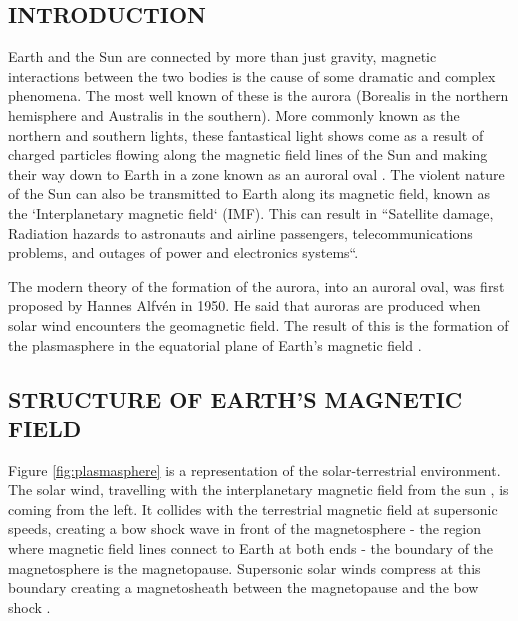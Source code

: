 \documentclass{article}
\begin{document}
\begin{multicols}{2}

\section{INTRODUCTION}
Earth and the Sun are connected by more than just gravity, magnetic interactions between the two bodies is the cause of some dramatic and complex phenomena. The most well known of these is the aurora (Borealis in the northern hemisphere and Australis in the southern). More commonly known as the northern and southern lights, these fantastical light shows come as a result of charged particles flowing along the magnetic field lines of the Sun and making their way down to Earth in a zone known as an auroral oval \cite{spaceweather}. The violent nature of the Sun can also be transmitted to Earth along its magnetic field, known as the `Interplanetary magnetic field` (IMF). This can result in ``Satellite damage, Radiation hazards to astronauts and airline passengers, telecommunications problems, and outages of power and electronics systems``\cite{spaceweather}. 

The modern theory of the formation of the aurora, into an auroral oval, was first proposed by Hannes Alfvén in 1950. He said that auroras are produced when solar wind encounters the geomagnetic field. The result of this is the formation of the plasmasphere in the equatorial plane of Earth's magnetic field \cite{cosmicelectrodyn}.

\subsection{STRUCTURE OF EARTH'S MAGNETIC FIELD}
Figure \ref{fig:plasmasphere} is a representation of the solar-terrestrial environment. The solar wind, travelling with the interplanetary magnetic field from the sun \cite{Svalgaard_2010}, is coming from the left. It collides with the terrestrial magnetic field at supersonic speeds, creating a bow shock wave in front of the magnetosphere - the region where magnetic field lines connect to Earth at both ends - the boundary of the magnetosphere is the magnetopause. Supersonic solar winds compress at this boundary creating a magnetosheath between the magnetopause and the bow shock \cite{BSPP}.


\end{multicols}
\end{document}
